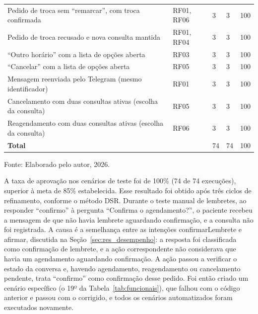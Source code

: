 \documentclass[12pt,a4paper]{extarticle}
\begin{document}
\begin{xltabular}{\textwidth}{Yp{1.6cm}p{2.3cm}p{2.1cm}p{1cm}}
Pedido de troca sem ``remarcar'', com troca confirmada & RF01, RF06 & 3 & 3 & 100 \\
Pedido de troca recusado e nova consulta mantida & RF01, RF04 & 3 & 3 & 100 \\
``Outro horário'' com a lista de opções aberta & RF03 & 3 & 3 & 100 \\
``Cancelar'' com a lista de opções aberta & RF05 & 3 & 3 & 100 \\
Mensagem reenviada pelo Telegram (mesmo identificador) & RF01 & 3 & 3 & 100 \\
Cancelamento com duas consultas ativas (escolha da consulta) & RF05 & 3 & 3 & 100 \\
Reagendamento com duas consultas ativas (escolha da consulta) & RF06 & 3 & 3 & 100 \\
\hline
\textbf{Total} & & 74 & 74 & 100 \\
\end{xltabular}
\vspace{0.3cm}

\footnotesize{Fonte: Elaborado pelo autor, 2026.}


A taxa de aprovação nos cenários de teste foi de 100\% (74 de 74 execuções), superior à meta de 85\% estabelecida. Esse resultado foi obtido após três ciclos de refinamento, conforme o método DSR. Durante o teste manual de lembretes, ao responder ``confirmo'' à pergunta ``Confirma o agendamento?'', o paciente recebeu a mensagem de que não havia lembrete aguardando confirmação, e a consulta não foi registrada. A causa é a semelhança entre as intenções confirmarLembrete e afirmar, discutida na Seção~\ref{sec:res_desempenho}: a resposta foi classificada como confirmação de lembrete, e a ação correspondente não considerava que havia um agendamento aguardando confirmação. A ação passou a verificar o estado da conversa e, havendo agendamento, reagendamento ou cancelamento pendente, trata ``confirmo'' como confirmação desse pedido. Foi então criado um cenário específico (o 19º da Tabela~\ref{tab:funcionais}), que falhou com o código anterior e passou com o corrigido, e todos os cenários automatizados foram executados novamente.
\end{document}
